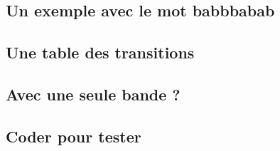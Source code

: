 \subsection{Un exemple avec le mot babbbabab}

	


\subsection{Une table des transitions}

	


\subsection{Avec une seule bande ?}

	


\subsection{Coder pour tester}

	
